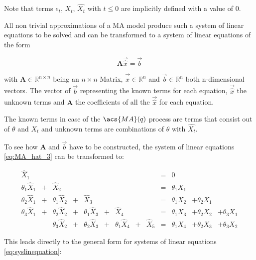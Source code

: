 Note that terms $e_t$, $X_t$, $\hat{X_t}$  with $t\leq0$ are implicitly defined with a value of $0$.

All non trivial approximations of a \acl{MA} model produce such a system of linear equations to be solved and can be transformed to a system of linear equations of the form

\begin{equation}\label{eq:syslinequation}
\mathbf{A}  \vec{\hat{x}} = \vec{b}
\end{equation}

with $\mathbf{A} \in \mathbb{R}^{n\times n}$ being an $n\times n$ Matrix,  $\vec{\hat{x}} \in \mathbb{R}^n$ and  $\vec{b}\in \mathbb{R}^n$ both n-dimensional vectors. The vector of $\vec{b}$ representing the known terms for each equation, $\vec{\hat{x}}$ the unknown terms and $\mathbf{A}$ the coefficients of all the $\vec{\hat{x}}$ for each equation.

The known terms in case of the $\acs{MA}(q)$ process are terms that consist out of $\theta$ and $X_t$ and unknown terms are combinations of $\theta$ with $\hat{X_t}$. 

To see how $\mathbf{A}$ and  $\vec{b}$ have to be constructed, the system of linear equations \eqref{eq:MA_hat_3} can be transformed to:

\begin{equation}\label{eq:MA_hat_3_system_2}
    \begin{array}{rcrcrcrcrclll}
        {\hat{X}}_{1}&&&&&&&&& = &0&&\\
        \theta_1 {\hat{X}}_{1} &+& {\hat{X}}_{2} & & & & & & &= &\theta_1 X_{1}&&\\
        
        \theta_2 {\hat{X}}_{1}&+&\theta_1 {\hat{X}}_{2} &+& {\hat{X}}_{3}&  &  &&& = &\theta_1 X_{2} &+ \theta_2 X_{1}&\\
        
        \theta_3 {\hat{X}}_{1} &+& \theta_2 {\hat{X}}_{2} &+&  \theta_1 {\hat{X}}_{3}&+& {\hat{X}}_{4}& && = &\theta_1 X_{3} &+ \theta_2 X_{2} &+ \theta_3 X_{1}\\ 	
        
        &&\theta_3 {\hat{X}}_{2} &+& \theta_2 {\hat{X}}_{3}&+& \theta_1 {\hat{X}}_{4} &+&{\hat{X}}_{5}& = &  \theta_1 X_{4} &+\theta_2 X_{3} &+ \theta_3 X_{2}
    \end{array}
\end{equation}


This leads directly to the general form for systems of linear equations \eqref{eq:syslinequation}:

